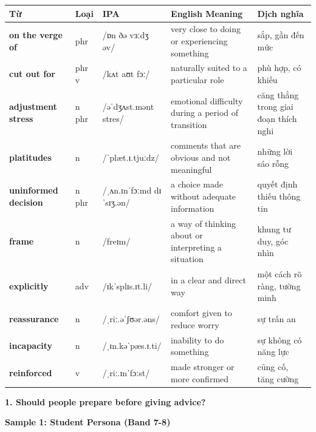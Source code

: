 \vspace{0.8em}
\begin{center}
\renewcommand{\arraystretch}{1.65}
\begin{tabularx}{\textwidth}{|V{0.22\textwidth}|C{0.07\textwidth}|I{0.20\textwidth}|Y|V{0.18\textwidth}|}
\hline
{}
\textbf{Từ} & \textbf{Loại} & \textbf{IPA} & \textbf{English Meaning} & \textbf{Dịch nghĩa} \\
\hline
\textbf{on the verge of} & phr & /ɒn ðə vɜːdʒ əv/ & very close to doing or experiencing something & sắp, gần đến mức \\ \hline
\textbf{cut out for} & phr v & /kʌt aʊt fɔː/ & naturally suited to a particular role & phù hợp, có khiếu \\ \hline
\textbf{adjustment stress} & n phr & /əˈdʒʌst.mənt stres/ & emotional difficulty during a period of transition & căng thẳng trong giai đoạn thích nghi \\ \hline
\textbf{platitudes} & n & /ˈplæt.ɪ.tjuːdz/ & comments that are obvious and not meaningful & những lời sáo rỗng \\ \hline
\textbf{uninformed decision} & n phr & /ˌʌn.ɪnˈfɔːmd dɪˈsɪʒ.ən/ & a choice made without adequate information & quyết định thiếu thông tin \\ \hline
\textbf{frame} & n & /freɪm/ & a way of thinking about or interpreting a situation & khung tư duy, góc nhìn \\ \hline
\textbf{explicitly} & adv & /ɪkˈsplɪs.ɪt.li/ & in a clear and direct way & một cách rõ ràng, tường minh \\ \hline
\textbf{reassurance} & n & /ˌriː.əˈʃʊər.əns/ & comfort given to reduce worry & sự trấn an \\ \hline
\textbf{incapacity} & n & /ˌɪn.kəˈpæs.ɪ.ti/ & inability to do something & sự không có năng lực \\ \hline
\textbf{reinforced} & v & /ˌriː.ɪnˈfɔːst/ & made stronger or more confirmed & củng cố, tăng cường \\ \hline
\end{tabularx}
\end{center}

\partthreeheader

\begin{ieltsquestion}
\textbf{1. Should people prepare before giving advice?}
\end{ieltsquestion}
\textbf{Sample 1: Student Persona (Band 7-8)}

